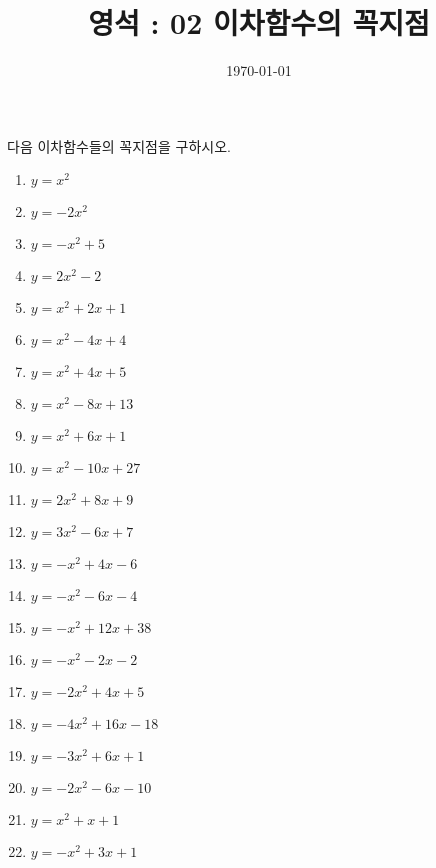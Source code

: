 \documentclass{article}
\newcounter{num}
\begin{document}
\title{영석 : 02 이차함수의 꼭지점}
\author{}
\date{\today}
\maketitle

다음 이차함수들의 꼭지점을 구하시오.

\begin{enumerate}[(1)]
\item
\(y=x^2\)
\item
\(y=-2x^2\)
\item
\(y=-x^2+5\)
\item
\(y=2x^2-2\)
\item
\(y=x^2+2x+1\)
\item
\(y=x^2-4x+4\)
\item
\(y=x^2+4x+5\)
\item
\(y=x^2-8x+13\)
\item
\(y=x^2+6x+1\)
\item
\(y=x^2-10x+27\)
\item
\(y=2x^2+8x+9\)
\item
\(y=3x^2-6x+7\)
\item
\(y=-x^2+4x-6\)
\item
\(y=-x^2-6x-4\)
\item
\(y=-x^2+12x+38\)
\item
\(y=-x^2-2x-2\)
\item
\(y=-2x^2+4x+5\)
\item
\(y=-4x^2+16x-18\)
\item
\(y=-3x^2+6x+1\)
\item
\(y=-2x^2-6x-10\)
\item
\(y=x^2+x+1\)
\item
\(y=-x^2+3x+1\)

\end{enumerate}
\end{document}
